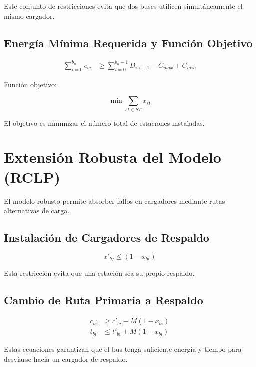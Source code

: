 \documentclass[12pt]{article}
\begin{document}
Este conjunto de restricciones evita que dos buses utilicen simultáneamente el mismo cargador.

\subsection{Energía Mínima Requerida y Función Objetivo}

\begin{align}
\sum_{i=0}^{b_n} e_{bi} &\geq \sum_{i=0}^{b_n-1} D_{i,i+1} - C_{max} + C_{min} \tag{19}
\end{align}

Función objetivo:

\begin{equation}
\min \sum_{st \in ST} x_{st}
\tag{20}
\end{equation}

El objetivo es minimizar el número total de estaciones instaladas.

\section{Extensión Robusta del Modelo (RCLP)}

El modelo robusto permite absorber fallos en cargadores mediante rutas alternativas de carga.

\subsection{Instalación de Cargadores de Respaldo}

\begin{equation}
x'_{bj} \leq (1 - x_{bi})
\tag{21}
\end{equation}

Esta restricción evita que una estación sea su propio respaldo.

\subsection{Cambio de Ruta Primaria a Respaldo}

\begin{align}
c_{bi} &\geq c'_{bi} - M(1 - x_{bi}) \tag{22} \\
t_{bi} &\leq t'_{bi} + M(1 - x_{bi}) \tag{23}
\end{align}

Estas ecuaciones garantizan que el bus tenga suficiente energía y tiempo para desviarse hacia un cargador de respaldo.
\end{document}
